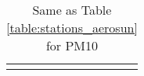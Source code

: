 \documentclass[journal abbreviation, manuscript]{copernicus}
\begin{document}
\begin{table}
\begin{tabularx}{\textwidth}{lX}
                                                                                                                                                                                                                                                                                                                                                                                                                                                                                                                                                                                                                                                                                                                                                                                                                                                                                                                                                                                                                                                                                                                                                    \\
  \bottomhline
 \end{tabularx}
 \caption{Same as Table \ref{table:stations_aerosun} for PM10}
 \label{table:stations_pm10}
\end{table}

\clearpage
\end{document}

